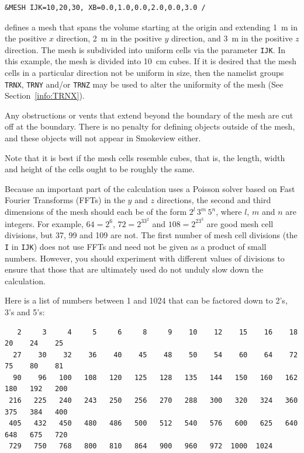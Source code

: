 \documentclass[11pt]{book}
\newcommand{\ct}{\tt\small}
\begin{document}
\footnotesize
\begin{verbatim}
&MESH IJK=10,20,30, XB=0.0,1.0,0.0,2.0,0.0,3.0 /
\end{verbatim}

\normalsize
\noindent
defines a mesh that spans the volume starting at the origin and extending 1~m in the positive
$x$ direction, 2~m in the positive $y$ direction, and 3~m in the positive $z$ direction.
The mesh is subdivided into uniform cells via the parameter
{\ct IJK}. In this example, the mesh is divided into 10~cm cubes.
If it is desired that the mesh cells in a particular direction not be uniform in size,
then the namelist groups {\ct TRNX}, {\ct TRNY} and/or {\ct TRNZ} may be used to alter the
uniformity of the mesh (See Section~\ref{info:TRNX}).

Any obstructions or vents that extend beyond the boundary of the mesh
are cut off at the boundary. There is no penalty for defining objects
outside of the mesh, and these objects will not appear in Smokeview either.

\begin{warning}
\noindent
Note that it is best if the mesh cells resemble cubes, that is, the
length, width and height of the cells ought to be roughly the same.
\end{warning}

\noindent
Because an important part of the calculation uses a Poisson solver based on
Fast Fourier Transforms (FFTs) in the $y$ and $z$ directions, the second and third dimensions
of the mesh should each be of the form $2^l \, 3^m \, 5^n$, where
$l$, $m$ and $n$ are integers. For example,
$64=2^6$, $72=2^33^2$ and $108=2^23^3$ are good mesh cell divisions, but 37, 99 and 109 are not.
The first number of mesh cell divisions (the {\ct I} in {\ct IJK}) does not use FFTs and need not be given as a
product of small numbers. However, you should experiment with different values of
divisions to ensure that those that are ultimately used do not unduly slow down the calculation.

Here is a list of numbers between 1 and 1024 that can be factored
down to 2's, 3's and 5's:

\footnotesize
\begin{verbatim}
   2     3     4     5     6     8     9    10    12    15    16    18    20    24    25
  27    30    32    36    40    45    48    50    54    60    64    72    75    80    81
  90    96   100   108   120   125   128   135   144   150   160   162   180   192   200
 216   225   240   243   250   256   270   288   300   320   324   360   375   384   400
 405   432   450   480   486   500   512   540   576   600   625   640   648   675   720
 729   750   768   800   810   864   900   960   972  1000  1024
\end{verbatim}
\normalsize
\end{document}

